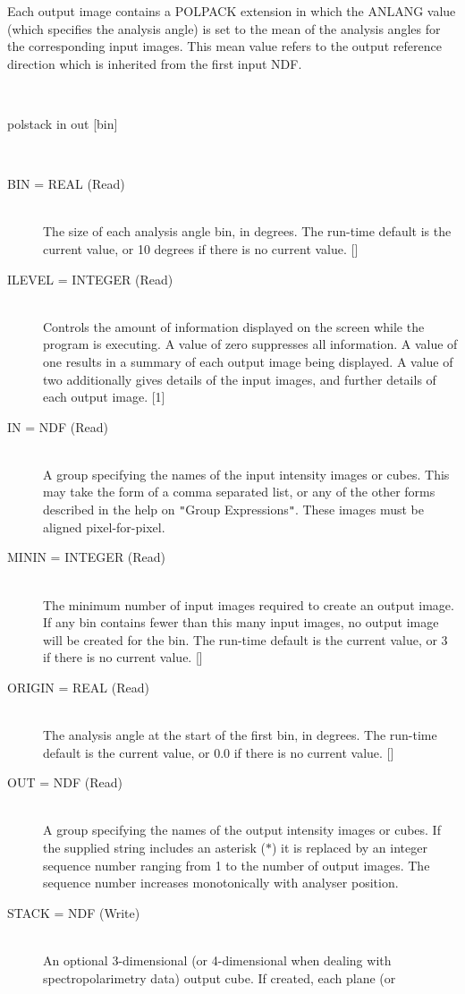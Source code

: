 \documentclass[twoside,11pt]{article}
\renewcommand{\_}{\texttt{\symbol{95}}}
\newcommand{\sstusage}[1]{\item[Usage:] \mbox{}
\\[1.3ex]{\raggedright \ssttt #1}}
\newcommand{\sstparameters}[1]{
   \item[Parameters:] \mbox{} \\
   \vspace{-3.5ex}
   \begin{description}
      #1
   \end{description}
}
\newcommand{\sstsubsection}[1]{ \item[{#1}] \mbox{} \\}
\newcommand{\sstusage}[1]{\item[Usage:]
      \begin{description}
         {\ssttt #1}
      \end{description}
      \\
   }
\newcommand{\sstparameters}[1]{
      \item[Parameters:] \\
      \begin{description}
         #1
      \end{description}
      \\
   }
\newcommand{\sstsubsection}[1]{\item[{#1}]}
\begin{document}
{{      Each output image contains a POLPACK extension in which the ANLANG
      value (which specifies the analysis angle) is set to the mean of the
      analysis angles for the corresponding input images. This mean value
      refers to the output reference direction which is inherited from
      the first input NDF.
   }
   \sstusage{
      polstack in out [bin]
   }
   \sstparameters{
      \sstsubsection{
         BIN = \_REAL (Read)
      }{
         The size of each analysis angle bin, in degrees. The run-time
         default is the current value, or 10 degrees if there is no
         current value. []
      }
      \sstsubsection{
         ILEVEL = \_INTEGER (Read)
      }{
         Controls the amount of information displayed on the screen while
         the program is executing. A value of zero suppresses all
         information. A value of one results in a summary of each
         output image being displayed. A value of two additionally gives
         details of the input images, and further details of each output
         image. [1]
      }
      \sstsubsection{
         IN = NDF (Read)
      }{
         A group specifying the names of the input intensity images or cubes.
         This may take the form of a comma separated list, or any of the other
         forms described in the help on {\tt "}Group Expressions{\tt "}. These images
         must be aligned pixel-for-pixel.
      }
      \sstsubsection{
         MININ = \_INTEGER (Read)
      }{
         The minimum number of input images required to create an output
         image. If any bin contains fewer than this many input images, no
         output image will be created for the bin. The run-time default
         is the current value, or 3 if there is no current value. []
      }
      \sstsubsection{
         ORIGIN = \_REAL (Read)
      }{
         The analysis angle at the start of the first bin, in degrees.
         The run-time default is the current value, or 0.0 if there is no
         current value. []
      }
      \sstsubsection{
         OUT = NDF (Read)
      }{
         A group specifying the names of the output intensity images or cubes.
         If the supplied string includes an asterisk ($*$) it is replaced by
         an integer sequence number ranging from 1 to the number of
         output images. The sequence number increases monotonically with
         analyser position.
      }
      \sstsubsection{
         STACK = NDF (Write)
      }{
         An optional 3-dimensional (or 4-dimensional when dealing with
         spectropolarimetry data) output cube. If created, each plane (or
}}}
\end{document}
